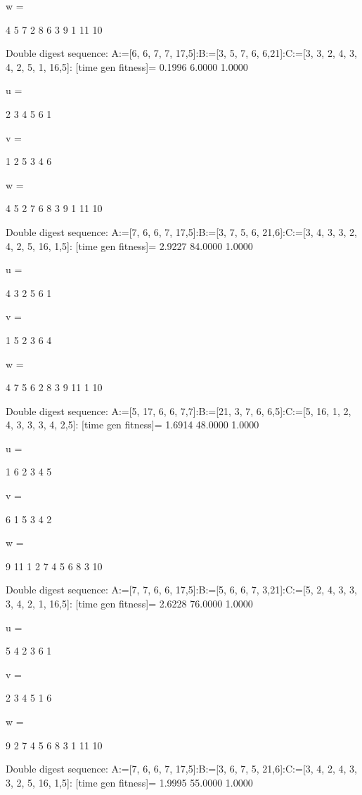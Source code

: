 w =

     4     5     7     2     8     6     3     9     1    11    10

Double digest sequence:
A:=[6, 6, 7, 7, 17,5]:B:=[3, 5, 7, 6, 6,21]:C:=[3, 3, 2, 4, 3, 4, 2, 5, 1, 16,5]:
[time gen fitness]=
    0.1996    6.0000    1.0000


u =

     2     3     4     5     6     1


v =

     1     2     5     3     4     6


w =

     4     5     2     7     6     8     3     9     1    11    10

Double digest sequence:
A:=[7, 6, 6, 7, 17,5]:B:=[3, 7, 5, 6, 21,6]:C:=[3, 4, 3, 3, 2, 4, 2, 5, 16, 1,5]:
[time gen fitness]=
    2.9227   84.0000    1.0000


u =

     4     3     2     5     6     1


v =

     1     5     2     3     6     4


w =

     4     7     5     6     2     8     3     9    11     1    10

Double digest sequence:
A:=[5, 17, 6, 6, 7,7]:B:=[21, 3, 7, 6, 6,5]:C:=[5, 16, 1, 2, 4, 3, 3, 3, 4, 2,5]:
[time gen fitness]=
    1.6914   48.0000    1.0000


u =

     1     6     2     3     4     5


v =

     6     1     5     3     4     2


w =

     9    11     1     2     7     4     5     6     8     3    10

Double digest sequence:
A:=[7, 7, 6, 6, 17,5]:B:=[5, 6, 6, 7, 3,21]:C:=[5, 2, 4, 3, 3, 3, 4, 2, 1, 16,5]:
[time gen fitness]=
    2.6228   76.0000    1.0000


u =

     5     4     2     3     6     1


v =

     2     3     4     5     1     6


w =

     9     2     7     4     5     6     8     3     1    11    10

Double digest sequence:
A:=[7, 6, 6, 7, 17,5]:B:=[3, 6, 7, 5, 21,6]:C:=[3, 4, 2, 4, 3, 3, 2, 5, 16, 1,5]:
[time gen fitness]=
    1.9995   55.0000    1.0000


